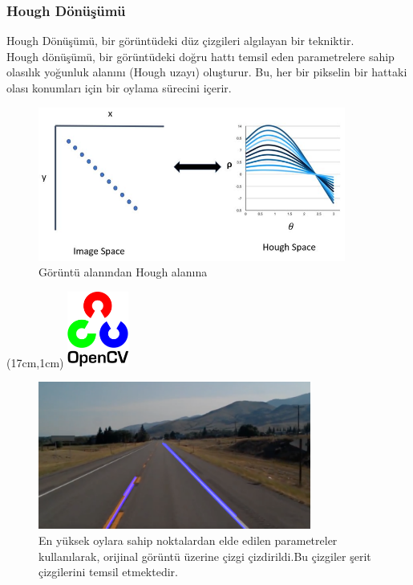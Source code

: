 \documentclass{article}
\begin{document}
\subsubsection{Hough Dönüşümü}
Hough Dönüşümü, bir görüntüdeki düz çizgileri algılayan bir tekniktir.\\[5pt]
Hough dönüşümü, bir görüntüdeki doğru hattı temsil eden parametrelere sahip olasılık yoğunluk alanını (Hough uzayı) oluşturur. Bu, her bir pikselin bir hattaki olası konumları için bir oylama sürecini içerir.

\begin{figure}[h]
  \centering
  \includegraphics[width=0.9\textwidth]{image/Resim29.png} %
  \caption{Görüntü alanından Hough alanına\cite{ranjan2020applied}}
  \label{fig:python27}  
\end{figure}
\newpage
\begin{textblock*}{5cm}(17cm,1cm) %
    \includegraphics[width=2cm]{image/Resim17.png} %
\end{textblock*}
\begin{figure}[h]
  \centering
  \includegraphics[width=0.8\textwidth]{image/Resim30.png} %
  \caption{En yüksek oylara sahip noktalardan elde edilen parametreler kullanılarak, orijinal görüntü üzerine çizgi çizdirildi.Bu çizgiler şerit çizgilerini temsil etmektedir.}
  \label{fig:python28}  
\end{figure}
\end{document}
